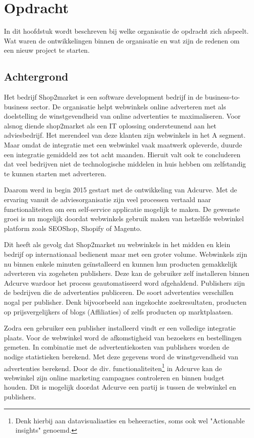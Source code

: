 
\chapter{Opdracht}

In dit hoofdstuk wordt beschreven bij welke organisatie de opdracht zich afspeelt. Wat waren de ontwikkelingen binnen de organisatie en wat zijn de redenen om een nieuw project te starten.

\section{Achtergrond}

Het bedrijf Shop2market is een software development bedrijf in de business-to-business sector. De organisatie helpt webwinkels online adverteren met als doelstelling de winstgevendheid van online advertenties te maximaliseren.
Voor alsnog diende shop2market als een IT oplossing ondersteunend aan het adviesbedrijf. Het merendeel van deze klanten zijn webwinkels in het A segment. Maar omdat de integratie met een webwinkel vaak maatwerk opleverde, duurde een integratie gemiddeld zes tot acht maanden. Hieruit valt ook te concluderen dat veel bedrijven niet de technologische middelen in huis hebben om zelfstandig te kunnen starten met adverteren.

Daarom werd in begin 2015 gestart met de ontwikkeling van Adcurve. Met de ervaring vanuit de adviesorganisatie zijn veel processen vertaald naar functionaliteiten om een self-service applicatie mogelijk te maken. De gewenste groei is nu mogelijk doordat webwinkels gebruik maken van hetzelfde webwinkel platform zoals SEOShop, Shopify of Magento.

Dit heeft als gevolg dat Shop2market nu webwinkels in het midden en klein bedrijf op internationaal bedienent maar met een groter volume. Webwinkels zijn nu binnen enkele minuten geïnstalleerd en kunnen hun producten gemakkelijk adverteren via zogeheten publishers. Deze kan de gebruiker zelf installeren binnen Adcurve wardoor het process geautomatiseerd word afgehaldend. Publishers zijn de bedrijven die de advertenties publiceren. De soort advertenties verschillen nogal per publisher. Denk bijvoorbeeld aan ingekochte zoekresultaten, producten op prijsvergelijkers of blogs (Affiliaties) of zelfs producten op marktplaatsen.

Zodra een gebruiker een publisher installeerd vindt er een volledige integratie plaats. Voor de webwinkel word de afkomstigheid van bezoekers en bestellingen gemeten. In combinatie met de advertentiekosten van publishers worden de nodige statistieken berekend. Met deze gegevens word de winstgevendheid van advertenties berekend. Door de div. functionaliteiten\footnote{Denk hierbij aan datavisualiasties en beheeracties, soms ook wel "Actionable insights" genoemd.} in Adcurve kan de webwinkel zijn online marketing campagnes controleren en binnen budget houden. Dit is mogelijk doordat Adcurve een partij is tussen de webwinkel en publishers.
\pagebreak

